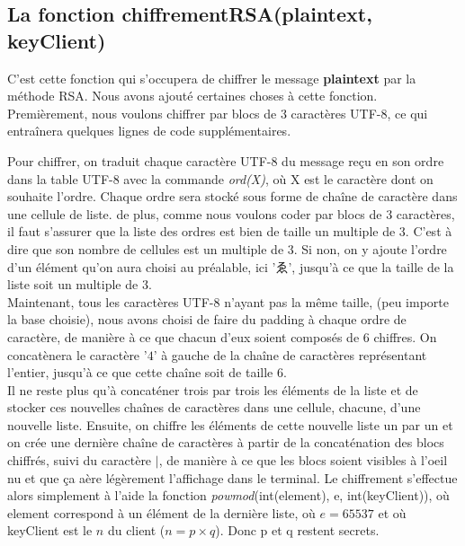 \documentclass[12pt]{article}
\theoremstyle{definition}
\begin{document}
	 \subsection{La fonction chiffrementRSA(plaintext, keyClient)}
C'est cette fonction qui s'occupera de chiffrer le message \textbf{plaintext} par la méthode RSA. Nous avons ajouté certaines choses à cette fonction. Premièrement, nous voulons chiffrer par blocs de $3$ caractères UTF-8, ce qui entraînera quelques lignes de code supplémentaires.\\
\begin{CJK}{UTF8}{min}
Pour chiffrer, on traduit chaque caractère UTF-8 du message reçu en son ordre dans la table UTF-8 avec la commande \textit{ord(X)}, où X est le caractère dont on souhaite l'ordre. Chaque ordre sera stocké sous forme de chaîne de caractère dans une cellule de liste. de plus, comme nous voulons coder par blocs de $3$ caractères, il faut s'assurer que la liste des ordres est bien de taille un multiple de $3$. C'est à dire que son nombre de cellules est un multiple de $3$. Si non, on y ajoute l'ordre d'un élément qu'on aura choisi au préalable, ici 'ゑ', jusqu'à ce que la taille de la liste soit un multiple de $3$.\\
Maintenant, tous les caractères UTF-8 n'ayant pas la même taille, (peu importe la base choisie), nous avons choisi de faire du padding à chaque ordre de caractère, de manière à ce que chacun d'eux soient composés de $6$ chiffres. On concatènera le caractère '$4$' à gauche de la chaîne de caractères représentant l'entier, jusqu'à ce que cette chaîne soit de taille $6$.\\
Il ne reste plus qu'à concaténer trois par trois les éléments de la liste et de stocker ces nouvelles chaînes de caractères dans une cellule, chacune, d'une nouvelle liste. Ensuite, on chiffre les éléments de cette nouvelle liste un par un et on crée une dernière chaîne de caractères à partir de la concaténation des blocs chiffrés, suivi du caractère $\mid$, de manière à ce que les blocs soient visibles à l'oeil nu et que ça aère légèrement l'affichage dans le terminal. Le chiffrement s'effectue alors simplement à l'aide la fonction \textit{powmod}(int(element), e, int(keyClient)), où element correspond à un élément de la dernière liste, où $e=65537$ et où keyClient est le $n$ du client ($n=p \times q$). Donc p et q restent secrets.

\end{CJK}
\end{document}
